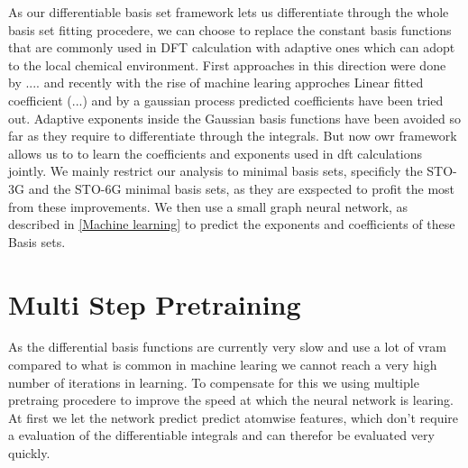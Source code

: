 As our differentiable basis set framework lets us differentiate through the whole basis set fitting procedere, we can choose to replace the constant basis functions that are commonly used in DFT calculation with adaptive ones which can adopt to the local chemical environment. First approaches in this direction were done by .... and recently with the rise of machine learing approches Linear fitted coefficient (...) and by a gaussian process predicted coefficients have been tried out. Adaptive exponents inside the Gaussian basis functions have been avoided so far as they require to differentiate through the integrals. But now owr framework allows us to to learn the coefficients and exponents used in dft calculations jointly. We mainly restrict our analysis to minimal basis sets, specificly the STO-3G and the STO-6G\cite{STO-3G} minimal basis sets, as they are exspected to profit the most from these improvements. We then use a small graph neural network, as described in \ref{Machine learning} to predict the exponents and coefficients of these Basis sets.
\section{Multi Step Pretraining}
As the differential basis functions are currently very slow and use a lot of vram compared to what is common in machine learing we cannot reach a very high number of iterations in learning. To compensate for this we using multiple pretraing procedere to improve the speed at which the neural network is learing. At first we let the network predict predict atomwise features, which don't require a evaluation of the differentiable integrals and can therefor be evaluated very quickly.
